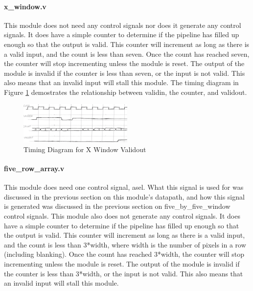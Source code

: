\paragraph{x\_window.v}
This module does not need any control signals nor does it generate any control 
signals. It does have a simple counter to determine if the pipeline has filled 
up enough so that the output is valid. This counter will increment as long as 
there is a valid input, and the count is less than seven. Once the count has 
reached seven, the counter will stop incrementing unless the module is reset. 
The output of the module is invalid if the counter is less than seven, or the 
input is not valid. This also means that an invalid input will stall this 
module. The timing diagram in Figure \ref{fig:timing_1} demostrates the 
relationship between validin, the counter, and validout.

\begin{figure}
    \includegraphics[width=0.5\textwidth]{processed_image_pngs/timing_1.png}
    \caption{Timing Diagram for X Window Validout}
    \label{fig:timing_1}
\end{figure}



\paragraph{five\_row\_array.v}
This module does need one control signal, asel. What this signal is used for was discussed in the previous section on this module's datapath, and how this signal is generated was discussed in the previous section on five\_by\_five\_window control signals. This module also does not generate any control signals. It does have a simple counter to determine if the pipeline has filled up enough so that the output is valid. This counter will increment as long as there is a valid input, and the count is less than 3*width, where width is the number of pixels in a row (including blanking). Once the count has reached 3*width, the counter will stop incrementing unless the module is reset. The output of the module is invalid if the counter is less than 3*width, or the input is not valid. This also means that an invalid input will stall this module.

